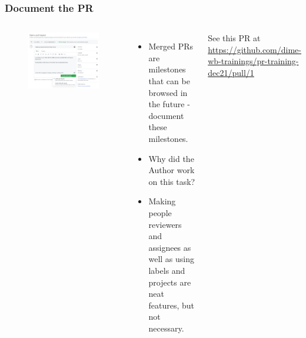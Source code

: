 \documentclass[aspectratio=169]{beamer}
\newcommand{\trainingURL}[1]{{\color{blue}\url{#1}}}
\newcommand{\traininerUsername}{dime-wb-trainings}
\newcommand{\repoName}{\traininerUsername/pr-training-dec21}
\newcommand{\trainingRepoURLwithParameter}[1]{\trainingURL{https://github.com/\repoName#1}}
\begin{document}
\begin{frame}
	\frametitle{Document the PR}
	\begin{columns}[c]
		
		\begin{figure}
			\centering
			\includegraphics[width=\textwidth]{./img/create-pr-1.png}
		\end{figure}
		
		\begin{itemize}
			\setlength\itemsep{1em}
			\item Merged PRs are milestones that can be browsed in the future - 
			document these milestones.
			\item Why did the Author work on this task?
			\item Making people reviewers and assignees as well as 
			using labels and projects are neat features, but not necessary.
		\end{itemize}
		
		\vspace{.25cm}
		\footnotesize See this PR at \trainingRepoURLwithParameter{/pull/1}
		
	\end{columns}
\end{frame}
\end{document}
